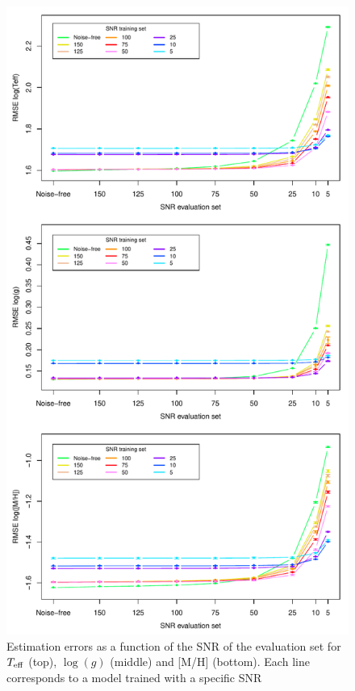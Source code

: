\documentclass[a4paper,fleqn,usenatbib]{mnras}
\begin{document}
{{{\begin{figure}
\centering\includegraphics[width=\columnwidth]{snr_errors_log_global.pdf}
\caption{Estimation errors as a function of the SNR of the evaluation
  set for $T_{\rm eff}$ (top), $\log(g)$ (middle) and [M/H]
  (bottom). Each line corresponds to a model trained with a specific
  SNR}
\label{fig:snrtrain}
\end{figure}

}}}
\end{document}
